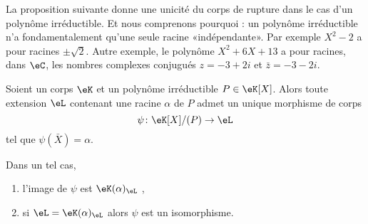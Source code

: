 \begin{normaltext}
    La proposition suivante donne une unicité du corps de rupture dans le cas d'un polynôme irréductible. Et nous comprenons pourquoi : un polynôme irréductible n'a fondamentalement qu'une seule racine «indépendante». Par exemple \( X^2-2\) a pour racines \( \pm\sqrt{ 2 }\). Autre exemple, le polynôme \( X^2+6X+13\) a pour racines, dans \( \eC\), les nombres complexes conjugués \( z=-3+2i\) et \( \bar z=-3-2i\).
\end{normaltext}

\begin{proposition}          \label{PROPooVJACooNDmlfb}
    Soient un corps \( \eK\) et un polynôme irréductible \( P\in \eK[X]\). Alors toute extension \( \eL\) contenant une racine \( \alpha\) de \( P\) admet un unique morphisme de corps
            \begin{equation}
                \psi\colon \eK[X]/(P)\to \eL
            \end{equation}
            tel que \( \psi(\bar X)=\alpha\).

    Dans un tel cas,
    \begin{enumerate}
        \item
            l'image de \( \psi\) est $\eK(\alpha)_{\eL}$ ,
        \item       \label{ITEMooHRFHooWLIdWU}
            si \( \eL=\eK(\alpha)_{\eL}\) alors \( \psi\) est un isomorphisme.
    \end{enumerate}

\end{proposition}

